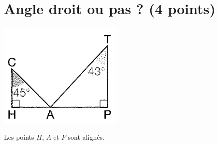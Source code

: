 \section{Angle droit ou pas ? (4 points)}

	\begin{center}
		\includegraphics[scale=0.8]{img/fig}
	\end{center}
	
	Les points $H$, $A$  et $P$ sont alignés.
	
